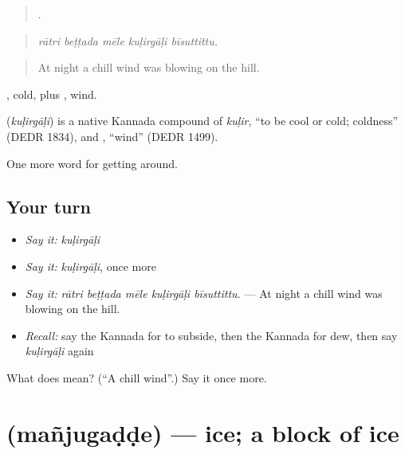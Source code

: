\begin{quote}
    .
\end{quote}

\begin{quote}
\emph{rātri beṭṭada mēle kuḷirgāḷi bīsuttittu.}
\end{quote}

\begin{quote}
At night a chill wind was blowing on the hill.
\end{quote}

, cold, plus , wind.

\begin{cousinweb}
\textbf{} (\emph{kuḷirgāḷi}) is a native Kannada compound of \emph{kuḷir}, \textquotedblleft{}to be cool or cold; coldness\textquotedblright{} (DEDR 1834), and , \textquotedblleft{}wind\textquotedblright{} (DEDR 1499).
\end{cousinweb}

\begin{grammarlens}[title={What you've built}]
One more word for getting around.
\end{grammarlens}

\subsection*{Your turn}
\begin{itemize}
\raggedright
  \item \emph{Say it:} \emph{kuḷirgāḷi}
  \item \emph{Say it:} \emph{kuḷirgāḷi}, once more
  \item \emph{Say it:} \emph{rātri beṭṭada mēle kuḷirgāḷi bīsuttittu.} — At night a chill wind was blowing on the hill.
  \item \emph{Recall:} say the Kannada for to subside, then the Kannada for dew, then say \emph{kuḷirgāḷi} again
\end{itemize}

\begin{tcolorbox}[breakable,colback=teal!4,colframe=teal!35!black,title={Before you move on}]
What does  mean? (\textquotedblleft{}A chill wind\textquotedblright{}.) Say it once more.
\end{tcolorbox}
\section[\texorpdfstring{\kn{ಮಂಜುಗಡ್ಡೆ} (mañjugaḍḍe)}{ಮಂಜುಗಡ್ಡೆ (mañjugaḍḍe)}]{ (mañjugaḍḍe) — ice; a block of ice}

